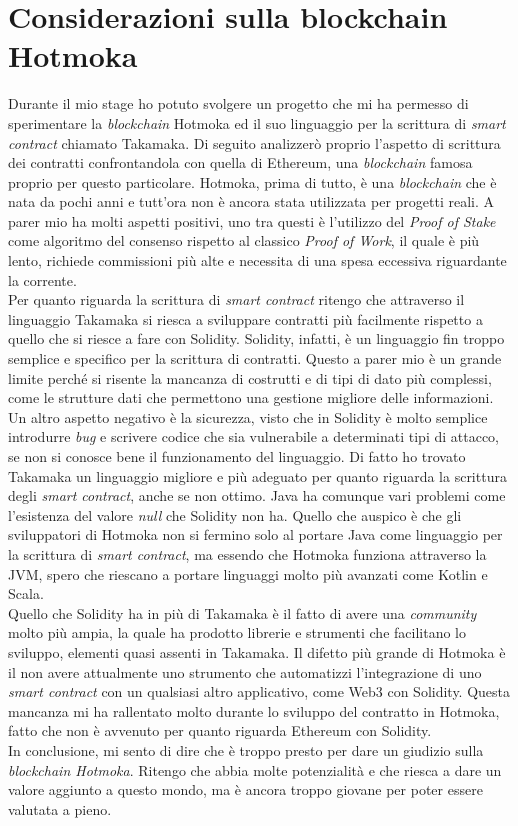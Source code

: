 
\section{Considerazioni sulla blockchain Hotmoka}
Durante il mio stage ho potuto svolgere un progetto che mi ha permesso di sperimentare la \textit{blockchain} Hotmoka ed il suo linguaggio per la scrittura di \textit{smart contract} chiamato Takamaka. Di seguito analizzerò proprio l'aspetto di scrittura dei contratti confrontandola con quella di Ethereum, una \textit{blockchain} famosa proprio per questo particolare. 
Hotmoka, prima di tutto, è una \textit{blockchain} che è nata da pochi anni e tutt'ora non è ancora stata utilizzata per progetti reali. A parer mio ha molti aspetti positivi, uno tra questi è l'utilizzo del \textit{Proof of Stake} come algoritmo del consenso rispetto al classico \textit{Proof of Work}, il quale è più lento, richiede commissioni più alte e necessita di una spesa eccessiva riguardante la corrente. \\

Per quanto riguarda la scrittura di \textit{smart contract} ritengo che attraverso il linguaggio Takamaka si riesca a sviluppare contratti più facilmente rispetto a quello che si riesce a fare con Solidity. Solidity, infatti, è un linguaggio fin troppo semplice e specifico per la scrittura di contratti. Questo a parer mio è un grande limite perché si risente la mancanza di costrutti e di tipi di dato più complessi, come le strutture dati che permettono una gestione migliore delle informazioni. Un altro aspetto negativo è la sicurezza, visto che in Solidity è molto semplice introdurre \textit{bug} e scrivere codice che sia vulnerabile a determinati tipi di attacco, se non si conosce bene il funzionamento del linguaggio.
Di fatto ho trovato Takamaka un linguaggio migliore e più adeguato per quanto riguarda la scrittura degli \textit{smart contract}, anche se non ottimo. Java ha comunque vari problemi come l'esistenza del valore \textit{null} che Solidity non ha. Quello che auspico è che gli sviluppatori di Hotmoka non si fermino solo al portare Java come linguaggio per la scrittura di \textit{smart contract}, ma essendo che Hotmoka funziona attraverso la JVM, spero che riescano a portare linguaggi molto più avanzati come Kotlin e Scala. \\

Quello che Solidity ha in più di Takamaka è il fatto di avere una \textit{community} molto più ampia, la quale ha prodotto librerie e strumenti che facilitano lo sviluppo, elementi quasi assenti in Takamaka. Il difetto più grande di Hotmoka è il non avere attualmente uno strumento che automatizzi l'integrazione di uno \textit{smart contract} con un qualsiasi altro applicativo, come Web3 con Solidity. Questa mancanza mi ha rallentato molto durante lo sviluppo del contratto in Hotmoka, fatto che non è avvenuto per quanto riguarda Ethereum con Solidity. \\

In conclusione, mi sento di dire che è troppo presto per dare un giudizio sulla \textit{blockchain Hotmoka}. Ritengo che abbia molte potenzialità e che riesca a dare un valore aggiunto a questo mondo, ma è ancora troppo giovane per poter essere valutata a pieno. 
